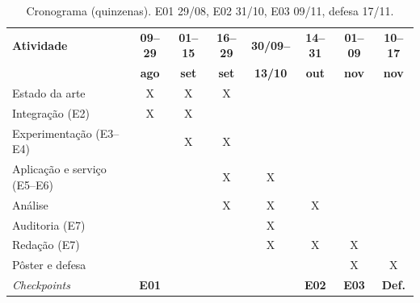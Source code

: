 \documentclass[conference]{IEEEtran}
\begin{document}
\begin{table}[!h]
\caption{Cronograma (quinzenas). E01 29/08, E02 31/10, E03 09/11, defesa 17/11.}
\label{tab:crono}
\centering
\renewcommand{\arraystretch}{0.88}
\setlength{\tabcolsep}{2.4pt}
\tiny
\begin{tabular}{@{}>{\raggedright\arraybackslash}p{1.85cm}ccccccc@{}}
\toprule
\textbf{Atividade} & \textbf{09--29} & \textbf{01--15} & \textbf{16--29} &
\textbf{30/09--} & \textbf{14--31} & \textbf{01--09} & \textbf{10--17} \\
 & \textbf{ago} & \textbf{set} & \textbf{set} & \textbf{13/10} &
\textbf{out} & \textbf{nov} & \textbf{nov} \\
\midrule
Estado da arte             & X & X & X &   &   &   &   \\
Integração (E2)            & X & X &   &   &   &   &   \\
Experimentação (E3--E4)    &   & X & X &   &   &   &   \\
Aplicação e serviço (E5--E6) &   &   & X & X &   &   &   \\
Análise                    &   &   & X & X & X &   &   \\
Auditoria (E7)             &   &   &   & X &   &   &   \\
Redação (E7)               &   &   &   & X & X & X &   \\
Pôster e defesa            &   &   &   &   &   & X & X \\
\midrule
\textit{Checkpoints} & \textbf{E01} & & & & \textbf{E02} & \textbf{E03} & \textbf{Def.} \\
\bottomrule
\end{tabular}
\end{table}
\end{document}
